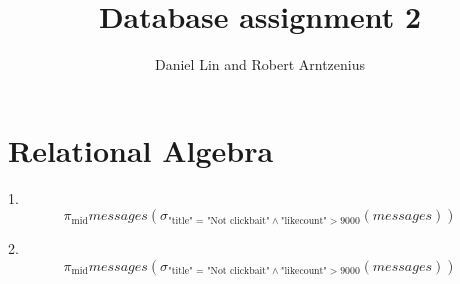 \documentclass{article}
\title{Database assignment 2}
\author{Daniel Lin and Robert Arntzenius}
\begin{document}
\maketitle

\begin{abstract}



\end{abstract}

\section{Relational Algebra}

\begin{flushleft}

1.
$$
\pi_{\text{mid}}messages(
\sigma_{\text{"title" = "Not clickbait"} \wedge \text{"likecount"} > 9000 }(messages))
$$

2.
$$
\pi_{\text{mid}}messages(
\sigma_{\text{"title" = "Not clickbait"} \wedge \text{"likecount"} > 9000 }(messages))
$$
\end{flushleft}
\end{document}
